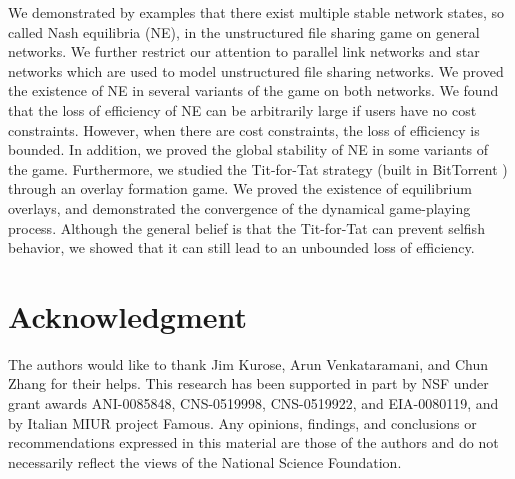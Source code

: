 \documentclass[conference]{IEEEtran}
\begin{document}
We demonstrated by examples that there exist multiple stable
network states, so called Nash equilibria (NE), in the
unstructured file sharing game on general networks.
We further restrict our attention to parallel link networks and
star networks which are used to model unstructured file sharing
networks. We proved the existence of NE in several variants of the
game on both networks. We found that the loss of efficiency of NE
can be arbitrarily large if users have no cost constraints.
However, when there are cost constraints, the loss of efficiency
is bounded. In addition, we proved the global stability of NE in
some variants of the game.
Furthermore, we studied the Tit-for-Tat strategy (built in
BitTorrent \cite{bt})
through an overlay formation game.
We proved the existence of equilibrium overlays, and demonstrated
the convergence of the dynamical game-playing process. Although
the general belief is that the Tit-for-Tat can prevent selfish
behavior, we showed that it can still lead to an unbounded loss of
efficiency.



\section*{Acknowledgment}

The authors would like to thank Jim Kurose, Arun Venkataramani,
and Chun Zhang for their helps. This research has been supported
in part by NSF under grant awards ANI-0085848, CNS-0519998,
CNS-0519922, and EIA-0080119, and by Italian MIUR project Famous.
Any opinions, findings, and conclusions or recommendations
expressed in this material are those of the authors and do not
necessarily reflect the views of the National Science Foundation.
\end{document}
